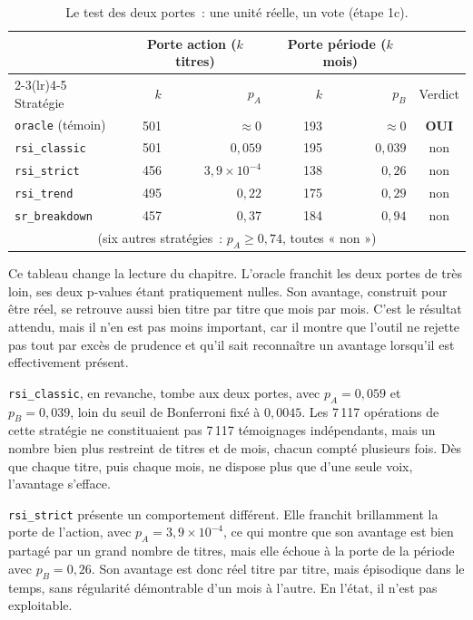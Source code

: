 \begin{table}[H]
\centering
\caption{Le test des deux portes~: une unité réelle, un vote (étape 1c).}
\label{tab:b1-dep-portes}
\small
\begin{tabular}{@{}lrrrrc@{}}
\toprule
 & \multicolumn{2}{c}{Porte action ($k$ titres)} & \multicolumn{2}{c}{Porte période ($k$ mois)} & \\
\cmidrule(lr){2-3}\cmidrule(lr){4-5}
Stratégie & $k$ & $p_A$ & $k$ & $p_B$ & Verdict \\
\midrule
\texttt{oracle} (témoin) & 501 & $\approx 0$          & 193 & $\approx 0$ & \textbf{OUI} \\
\midrule
\texttt{rsi\_classic}  & 501 & $0{,}059$            & 195 & $0{,}039$ & non \\
\texttt{rsi\_strict}   & 456 & $3{,}9\times10^{-4}$ & 138 & $0{,}26$  & non \\
\texttt{rsi\_trend}    & 495 & $0{,}22$             & 175 & $0{,}29$  & non \\
\texttt{sr\_breakdown} & 457 & $0{,}37$             & 184 & $0{,}94$  & non \\
\multicolumn{6}{c}{\footnotesize (six autres stratégies~: $p_A \ge 0{,}74$, toutes « non »)} \\
\bottomrule
\end{tabular}
\end{table}
Ce tableau change la lecture du chapitre. L'oracle franchit les deux portes de
très loin, ses deux p-values étant pratiquement nulles. Son avantage, construit
pour être réel, se retrouve aussi bien titre par titre que mois par mois.
C'est le résultat attendu, mais il n'en est pas moins important, car il montre
que l'outil ne rejette pas tout par excès de prudence et qu'il sait reconnaître
un avantage lorsqu'il est effectivement présent.

\texttt{rsi\_classic}, en revanche, tombe aux deux portes, avec
$p_A = 0{,}059$ et $p_B = 0{,}039$, loin du seuil de Bonferroni fixé à
$0{,}0045$. Les 7\,117 opérations de cette stratégie ne constituaient pas
7\,117 témoignages indépendants, mais un nombre bien plus restreint de titres
et de mois, chacun compté plusieurs fois. Dès que chaque titre, puis chaque
mois, ne dispose plus que d'une seule voix, l'avantage s'efface.

\texttt{rsi\_strict} présente un comportement différent. Elle franchit
brillamment la porte de l'action, avec $p_A = 3{,}9\times10^{-4}$, ce qui
montre que son avantage est bien partagé par un grand nombre de titres, mais
elle échoue à la porte de la période avec $p_B = 0{,}26$. Son avantage est
donc réel titre par titre, mais épisodique dans le temps, sans régularité
démontrable d'un mois à l'autre. En l'état, il n'est pas exploitable.

